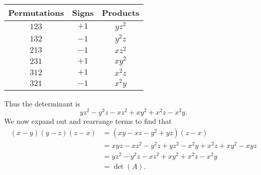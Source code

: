\documentclass[12pt,a4paper]{article}
\theoremstyle{definition}
\begin{document}
\begin{solution}
	\begin{center}
	\begin{tabular}{ |c|c|c| } 
	\hline
	Permutations & Signs & Products \\
	\hline
	$123$ & $+1$ & $yz^2$ \\
	\hline 
	$132$ & $-1$ & $y^2z$ \\ 
	\hline
	$213$ & $-1$ & $xz^2$ \\ 
	\hline
	$231$ & $+1$ & $xy^2$ \\ 
	\hline
	$312$ & $+1$ & $x^2z$ \\ 
	\hline
	$321$ & $-1$ & $x^2 y$ \\ 
	\hline
	\end{tabular}
	\end{center}
	Thus the determinant is
	\[ yz^2 - y^2 z - xz^2 + xy^2 + x^2z - x^2y. \]
	We now expand out and rearrange terms to find that
	\begin{align*}
		(x-y)(y-z)(z-x) &= (xy - xz - y^2 + yz)(z - x)\\
		&= xyz - xz^2 - y^2z + yz^2 - x^2y + x^2z + xy^2 - xyz\\
		&= yz^2 - y^2 z - xz^2 + xy^2 + x^2z - x^2y\\
		&= \det(A).
	\end{align*}
\end{solution}
\end{document}
